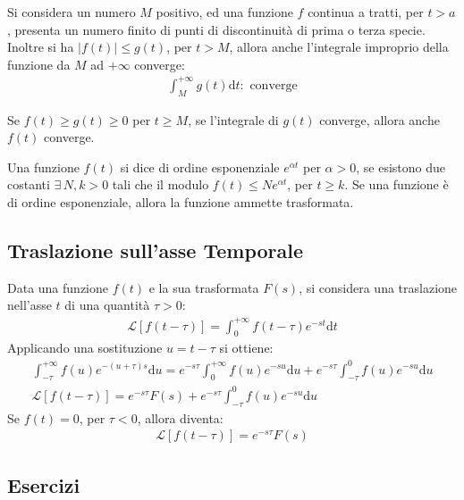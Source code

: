 \documentclass{article}
\newcommand{\df}{\mathrm{d}}
\newcommand{\intab}[4]{\displaystyle\int_{#1}^{#2}{#3}\df{#4}}
\newcommand{\intpinf}[2]{\intab{0}{+\infty}{#1}{#2}}
\numberwithin{equation}{subsection}
\begin{document}
Si considera un numero $M$ positivo, ed una funzione $f$ continua a tratti, per $t>a$, presenta un numero finito di punti di discontinuità di prima o terza specie. Inoltre si ha $|f(t)|\leq g(t)$, per $t>M$, allora anche l'integrale improprio della funzione da $M$ ad $+\infty$ converge:
\begin{gather*}
    \int_M^{+\infty}g(t)\df t:\mbox{ converge}
\end{gather*}

Se $f(t)\geq g(t)\geq0$ per $t\geq M$, se l'integrale di $g(t)$ converge, allora anche $f(t)$ converge. 


Una funzione $f(t)$ si dice di ordine esponenziale $e^{\alpha t}$ per $\alpha>0$, se esistono due costanti $\exists\,N,k>0$ tali che il modulo $f(t)\leq Ne^{\alpha t}$, per $t\geq k$. 
Se una funzione è di ordine esponenziale, allora la funzione ammette trasformata. 

\subsection{Traslazione sull'asse Temporale}

Data una funzione $f(t)$ e la sua trasformata $F(s)$, si considera una traslazione nell'asse $t$ di una quantità $\tau>0$:
\begin{gather*}
    \mathscr{L}[f(t-\tau)]=\intpinf{f(t-\tau)e^{-st}}{t}
\end{gather*}
Applicando una sostituzione $u=t-\tau$ si ottiene:
\begin{gather*}
    \int_{-\tau}^{+\infty}{ f(u)e^{-(u+\tau)s}}{\df u}=e^{-s\tau}\intpinf{f(u)e^{-su}}{u}+e^{-s\tau}\int_{-\tau}^0f(u)e^{-su}\df u\\
    \mathscr{L}[f(t-\tau)]=e^{-s\tau}F(s)+e^{-s\tau}\int_{-\tau}^0f(u)e^{-su}\df u
\end{gather*}
Se $f(t)=0$, per $\tau<0$, allora diventa:
\begin{gather*}
    \mathscr{L}[f(t-\tau)]=e^{-s\tau}F(s)
\end{gather*}

\subsection*{Esercizi}
\end{document}
